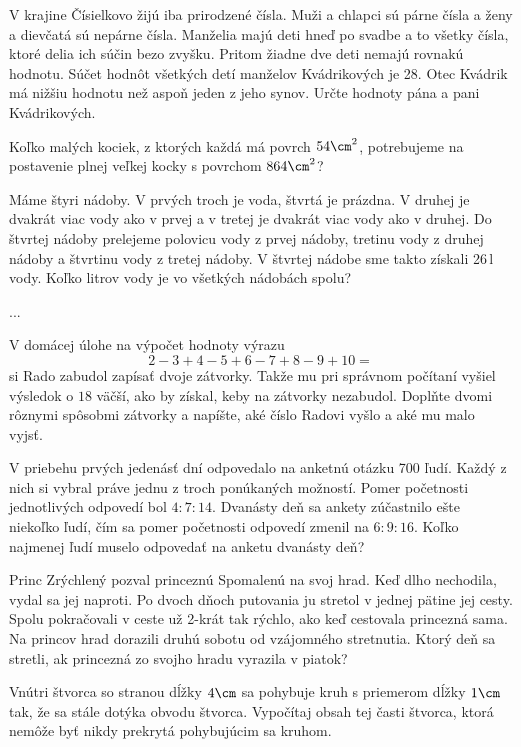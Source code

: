 {%
V krajine Čísielkovo žijú iba prirodzené čísla. Muži a chlapci sú párne čísla a ženy a dievčatá sú
nepárne čísla. Manželia majú deti hneď po svadbe a to všetky čísla, ktoré delia ich súčin bezo
zvyšku. Pritom žiadne dve deti nemajú rovnakú hodnotu. Súčet hodnôt všetkých detí manželov
Kvádrikových je 28. Otec Kvádrik má nižšiu hodnotu než aspoň jeden z jeho synov. Určte
hodnoty pána a pani Kvádrikových.}

{%
Koľko malých kociek, z ktorých každá má povrch $54\cm^2$, potrebujeme na postavenie plnej
veľkej kocky s povrchom $864\cm^2$?}

{%
Máme štyri nádoby. V prvých troch je voda, štvrtá je prázdna. V druhej je dvakrát viac vody ako
v prvej a v tretej je dvakrát viac vody ako v druhej. Do štvrtej nádoby prelejeme polovicu vody
z prvej nádoby, tretinu vody z druhej nádoby a štvrtinu vody z tretej nádoby. V štvrtej nádobe
sme takto získali 26\,l vody. Koľko litrov vody je vo všetkých nádobách spolu?}

{%
...}

{%
V domácej úlohe na výpočet hodnoty výrazu
$$
2 - 3 + 4 - 5 + 6 - 7 + 8 - 9 + 10 =
$$
si Rado zabudol zapísať dvoje zátvorky. Takže mu pri správnom počítaní vyšiel výsledok o $18$
väčší, ako by získal, keby na zátvorky nezabudol. Doplňte dvomi rôznymi spôsobmi zátvorky
a napíšte, aké číslo Radovi vyšlo a aké mu malo vyjsť.}

{%
V priebehu prvých jedenásť dní odpovedalo na anketnú otázku 700 ľudí. Každý z nich si vybral
práve jednu z troch ponúkaných možností. Pomer početnosti jednotlivých odpovedí bol $4:7:14$.
Dvanásty deň sa ankety zúčastnilo ešte niekoľko ľudí, čím sa pomer početnosti odpovedí zmenil
na $6:9:16$. Koľko najmenej ľudí muselo odpovedať na anketu dvanásty deň?}

{%
Princ Zrýchlený pozval princeznú Spomalenú na svoj hrad. Keď dlho nechodila, vydal sa jej
naproti. Po dvoch dňoch putovania ju stretol v jednej pätine jej cesty. Spolu pokračovali
v ceste už 2-krát tak rýchlo, ako keď cestovala princezná sama. Na princov hrad dorazili
druhú sobotu od vzájomného stretnutia. Ktorý deň sa stretli, ak princezná zo svojho hradu
vyrazila v piatok?}

{%
Vnútri štvorca so stranou dĺžky $4\cm$ sa pohybuje kruh s priemerom dĺžky $1\cm$
tak, že sa stále dotýka obvodu štvorca. Vypočítaj obsah tej časti štvorca, ktorá
nemôže byť nikdy prekrytá pohybujúcim sa kruhom.}


